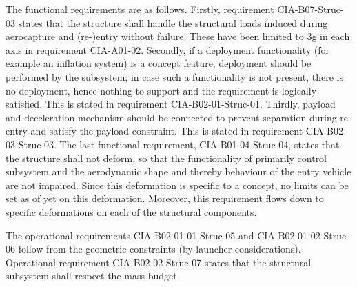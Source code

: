 The functional requirements are as follows. Firstly, requirement CIA-B07-Struc-03 states that the structure shall handle the structural loads induced during aerocapture and (re-)entry without failure. These have been limited to 3g in each axis in requirement CIA-A01-02. Secondly, if a deployment functionality  (for example an inflation system) is a concept feature, deployment should be performed by the subsystem; in case such a functionality is not present, there is no deployment, hence nothing to support and the requirement is logically satisfied. This is stated in requirement CIA-B02-01-Struc-01. Thirdly, payload and deceleration mechanism should be connected to prevent separation during re-entry and satisfy the payload constraint. This is stated in requirement CIA-B02-03-Struc-03. The last functional requirement, CIA-B01-04-Struc-04, states that the structure shall not deform, so that the functionality of primarily control subsystem and the aerodynamic shape and thereby behaviour of the entry vehicle are not impaired. Since this deformation is specific to a concept, no limits can be set as of yet on this deformation. Moreover, this requirement flows down to specific deformations on each of the structural components.

The operational requirements CIA-B02-01-01-Struc-05 and CIA-B02-01-02-Struc-06 follow from the geometric constraints (by launcher considerations). Operational requirement CIA-B02-02-Struc-07 states that the structural subsystem shall respect the mass budget.